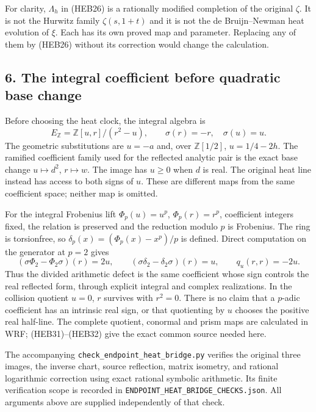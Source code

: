 \documentclass[
  10pt,
  a4paper,
]{article}
\begin{document}
For clarity, \(\Lambda_h\) in (HEB26) is a rationally modified
completion of the original \(\zeta\). It is not the Hurwitz family
\(\zeta(s,1+t)\) and it is not the de Bruijn--Newman heat evolution of
\(\xi\). Each has its own proved map and parameter. Replacing any of
them by (HEB26) without its correction would change the calculation.

\subsection{6. The integral coefficient before quadratic base
change}\label{the-integral-coefficient-before-quadratic-base-change}

Before choosing the heat clock, the integral algebra is \[
E_{\mathbb Z}=\mathbb Z[u,r]/(r^2-u),\qquad
\sigma(r)=-r,\quad\sigma(u)=u.
\tag{HEB31}
\] The geometric substitutions are \(u=-a\) and, over
\(\mathbb Z[1/2]\), \(u=1/4-2h\). The ramified coefficient family used
for the reflected analytic pair is the exact base change
\(u\mapsto d^2\), \(r\mapsto w\). The image has \(u\ge0\) when \(d\) is
real. The original heat line instead has access to both signs of \(u\).
These are different maps from the same coefficient space; neither map is
omitted.

For the integral Frobenius lift \(\Phi_p(u)=u^p\), \(\Phi_p(r)=r^p\),
coefficient integers fixed, the relation is preserved and the reduction
modulo \(p\) is Frobenius. The ring is torsionfree, so
\(\delta_p(x)=(\Phi_p(x)-x^p)/p\) is defined. Direct computation on the
generator at \(p=2\) gives \[
(\sigma\Phi_2-\Phi_2\sigma)(r)=2u,
\qquad(\sigma\delta_2-\delta_2\sigma)(r)=u,
\qquad q_u(r,r)=-2u.
\tag{HEB32}
\] Thus the divided arithmetic defect is the same coefficient whose sign
controls the real reflected form, through explicit integral and complex
realizations. In the collision quotient \(u=0\), \(r\) survives with
\(r^2=0\). There is no claim that a \(p\)-adic coefficient has an
intrinsic real sign, or that quotienting by \(u\) chooses the positive
real half-line. The complete quotient, conormal and prism maps are
calculated in WRF; (HEB31)--(HEB32) give the exact common source needed
here.

The accompanying \texttt{check\_\allowbreak{}endpoint\_\allowbreak{}heat\_\allowbreak{}bridge.\allowbreak{}py} verifies the
original three images, the inverse chart, source reflection, matrix
isometry, and rational logarithmic correction using exact rational
symbolic arithmetic. Its finite verification scope is recorded in
\texttt{ENDPOINT\_\allowbreak{}HEAT\_\allowbreak{}BRIDGE\_\allowbreak{}CHECKS.\allowbreak{}json}. All arguments above are
supplied independently of that check.
\end{document}
